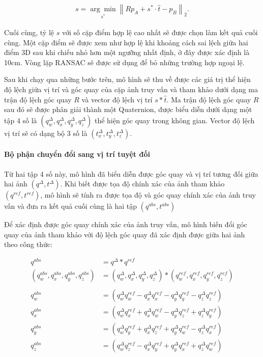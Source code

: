 $$
\begin{aligned}
    s=\underset{s^*}{\arg \min }\left\|R p_A+s^* \cdot \hat{t}-p_B\right\|_2 .
\end{aligned}
$$

Cuối cùng, tỷ lệ $s$ với số cặp điểm hợp lệ cao nhất sẽ được chọn làm kết quả cuối cùng. Một cặp điểm sẽ được xem như hợp lệ khi khoảng cách sai lệch giữa hai điểm 3D sau khi chiếu nhỏ hơn một ngưỡng nhất định, ở đây được xác định là 10cm. Vòng lặp RANSAC sẽ được sử dụng để bỏ những trường hợp ngoại lệ.

Sau khi chạy qua những bước trên, mô hình sẽ thu về được các giá trị thể hiện độ lệch giữa vị trí và góc quay của cặp ảnh truy vấn và tham khảo dưới dạng ma trận độ lệch góc quay $R$ và vector độ lệch vị trí $s*\hat{t}$. Ma trận độ lệch góc quay $R$ sau đó sẽ được phân giải thành một Quaternion, được biểu diễn dưới dạng một tập 4 số là $(q^{\Delta}_w,q^{\Delta}_x,q^{\Delta}_y,q^{\Delta}_z)$ thể hiện góc quay trong không gian. Vector độ lệch vị trí sẽ có dạng bộ 3 số là $(t^{\Delta}_x,t^{\Delta}_y,t^{\Delta}_z)$. 

\paragraph*{Bộ phận chuyển đổi sang vị trí tuyệt đối}

Từ hai tập 4 số này, mô hình đã biểu diễn được góc quay và vị trí tương đối giữa hai ảnh $(q^{\Delta},t^{\Delta})$. Khi biết được tọa độ chính xác của ảnh tham khảo $(q^{ref},t^{ref})$, mô hình sẽ tính ra được tọa độ và góc quay chính xác của ảnh truy vấn và đưa ra kết quả cuối cùng là hai tập $(q^{abs},t^{abs})$

Để xác định được góc quay chính xác của ảnh truy vấn, mô hình biến đổi góc quay của ảnh tham khảo với độ lệch góc quay đã xác định được giữa hai ảnh theo công thức:

$$
\begin{aligned}
    q^{abs} &= q^{\Delta} * q^{ref} \\
    (q^{abs}_w,q^{abs}_x,q^{abs}_y,q^{abs}_z) &= (q^{\Delta}_w,q^{\Delta}_x,q^{\Delta}_y,q^{\Delta}_z) * (q^{ref}_w,q^{ref}_x,q^{ref}_y,q^{ref}_z) \\ \\
    q^{abs}_w &=\left(q^{\Delta}_w q^{ref}_w-q^{\Delta}_x q^{ref}_x-q^{\Delta}_y q^{ref}_y-q^{\Delta}_z q^{ref}_z\right) \\
    q^{abs}_x &=\left(q^{\Delta}_w q^{ref}_x+q^{\Delta}_x q^{ref}_w-q^{\Delta}_y q^{ref}_z+q^{\Delta}_z q^{ref}_y\right) \\
    q^{abs}_y &=\left(q^{\Delta}_w q^{ref}_y+q^{\Delta}_x q^{ref}_z+q^{\Delta}_y q^{ref}_w-q^{\Delta}_z q^{ref}_x\right) \\
    q^{abs}_z &=\left(q^{\Delta}_w q^{ref}_z-q^{\Delta}_x q^{ref}_y+q^{\Delta}_y q^{ref}_x+q^{\Delta}_z q^{ref}_w\right)
\end{aligned}
$$

